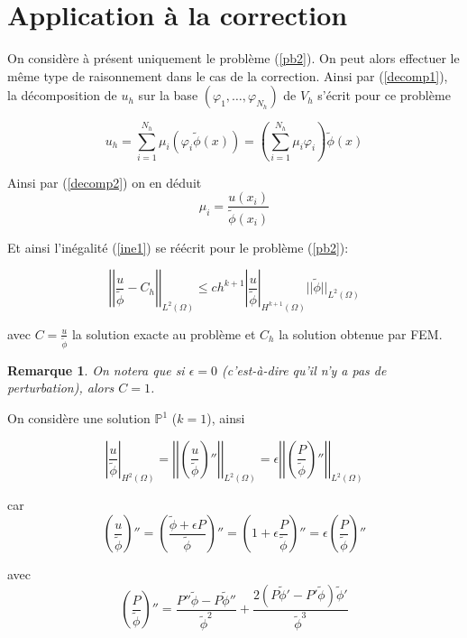 \documentclass[french]{article}
\newtheorem*{Rem}{Remarque}
\begin{document}
	\section*{Application à la correction}
	
	On considère à présent uniquement le problème (\ref{pb2}). On peut alors effectuer le même type de raisonnement dans le cas de la correction. Ainsi par (\ref{decomp1}), la décomposition de $u_h$ sur la base $(\varphi_1,\dots,\varphi_{N_h})$ de $V_h$ s'écrit pour ce problème
	
	\begin{equation}
		u_h=\sum_{i=1}^{N_h}\mu_i(\varphi_i\tilde{\phi}(x))=\left(\sum_{i=1}^{N_h}\mu_i\varphi_i\right)\tilde{\phi}(x) \label{decomp2}
	\end{equation}
		
	Ainsi par (\ref{decomp2}) on en déduit
	$$\mu_i=\frac{u(x_i)}{\tilde{\phi}(x_i)}$$

	Et ainsi l'inégalité (\ref{ine1}) se réécrit pour le problème (\ref{pb2}):
	
	\begin{equation}
		\left|\left|\frac{u}{\tilde{\phi}}-C_h\right|\right|_{L^2(\Omega)}\le ch^{k+1}\left|\frac{u}{\tilde{\phi}}\right|_{H^{k+1}(\Omega)}||\tilde{\phi}||_{L^2(\Omega)} \label{ine2}
	\end{equation}

	avec $C=\frac{u}{\tilde{\phi}}$ la solution exacte au problème et $C_h$ la solution obtenue par FEM.
	
	\begin{Rem}
		On notera que si $\epsilon=0$ (c'est-à-dire qu'il n'y a pas de perturbation), alors $C=1$.
	\end{Rem}
	
	On considère une solution $\mathbb{P}^1$ ($k=1$), ainsi
	
	\begin{equation}
		\left|\frac{u}{\tilde{\phi}}\right|_{H^2(\Omega)}=\left|\left|\left(\frac{u}{\tilde{\phi}}\right)''\right|\right|_{L^2(\Omega)}=\epsilon\left|\left|\left(\frac{P}{\tilde{\phi}}\right)''\right|\right|_{L^2(\Omega)} \label{der1}
	\end{equation}
	
	car
	$$\left(\frac{u}{\tilde{\phi}}\right)''=\left(\frac{\tilde{\phi}+\epsilon P}{\tilde{\phi}}\right)''=\left(1+\epsilon\frac{P}{\tilde{\phi}}\right)''=\epsilon\left(\frac{P}{\tilde{\phi}}\right)''$$
	
	avec
	$$\left(\frac{P}{\tilde{\phi}}\right)''=\frac{P''\tilde{\phi}-P\tilde{\phi}''}{\tilde{\phi}^2}+\frac{2(P\tilde{\phi}'-P'\tilde{\phi})\tilde{\phi}'}{\tilde{\phi}^3}$$
\end{document}
